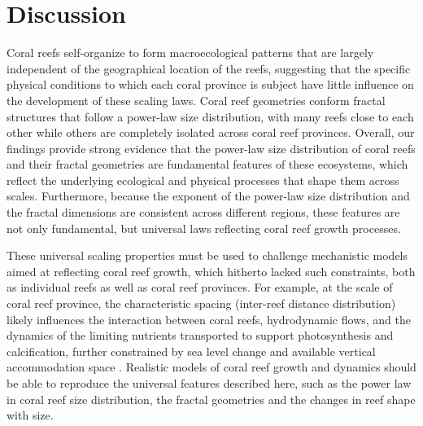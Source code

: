 \section{Discussion}

Coral reefs self-organize to form macroecological patterns that are largely
independent of the geographical location of the reefs, suggesting that the
specific physical conditions to which each coral province is subject have
little influence on the development of these scaling laws. Coral reef
geometries conform fractal structures that follow a power-law size
distribution, with many reefs close to each other while others are completely
isolated across coral reef provinces. Overall, our findings provide strong
evidence that the power-law size distribution of coral reefs and their fractal
geometries are fundamental features of these ecosystems, which reflect the
underlying ecological and physical processes that shape them across scales.
Furthermore, because the exponent of the power-law size distribution and the
fractal dimensions are consistent across different regions, these features are
not only fundamental, but universal laws reflecting coral reef growth
processes.

These universal scaling properties must be used to challenge mechanistic
models aimed at reflecting coral reef growth, which hitherto lacked such
constraints, both as individual reefs as well as coral reef provinces. For
example, at the scale of coral reef province, the characteristic spacing
(inter-reef distance distribution) likely influences the interaction between
coral reefs, hydrodynamic flows, and the dynamics of the limiting nutrients
transported to support photosynthesis and calcification, further constrained by
sea level change and available vertical accommodation space \cite{Nakamura2007,
    Mistr2003, Bosscher1992}. Realistic models of coral reef growth and
dynamics
should be able to reproduce the universal features described here, such as the
power law in coral reef size distribution, the fractal geometries and the
changes in reef shape with size.

